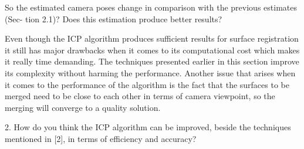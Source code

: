 So the estimated camera poses change in comparison with the previous estimates (Sec- tion 2.1)? Does this estimation produce better results?

Even though the ICP algorithm produces sufficient results for surface registration it still has major drawbacks when it comes to its computational cost which makes it really time demanding. The techniques presented earlier in this section improve its complexity without harming the performance. Another issue that arises when it comes to the performance of the algorithm is the fact that the surfaces to be merged need to be close to each other in terms of camera viewpoint, so the merging will converge to a quality solution.

2. How do you think the ICP algorithm can be improved, beside the techniques mentioned in [2], in terms of efficiency and accuracy?


